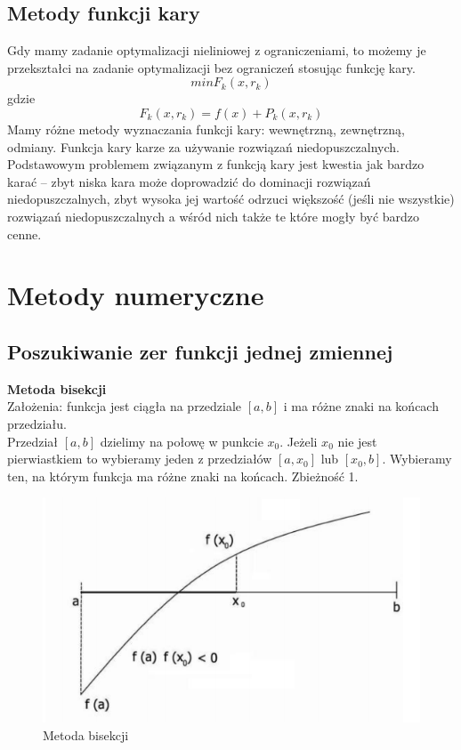 \documentclass[12pt]{article}
\begin{document}
\subsection{Metody funkcji kary}
Gdy mamy zadanie optymalizacji nieliniowej z ograniczeniami, to możemy je przekształci na zadanie optymalizacji bez ograniczeń stosując funkcję kary.
$$min F_{k}(x,r_{k})$$ gdzie $$F_{k}(x,r_{k}) = f(x) + P_{k}(x,r_{k})$$ Mamy różne metody wyznaczania funkcji kary: wewnętrzną, zewnętrzną, odmiany. Funkcja kary karze za używanie rozwiązań niedopuszczalnych. Podstawowym problemem związanym z funkcją kary jest kwestia jak bardzo karać – zbyt niska kara może doprowadzić do dominacji rozwiązań niedopuszczalnych, zbyt wysoka jej wartość odrzuci większość (jeśli nie wszystkie) rozwiązań niedopuszczalnych a wśród nich także te które mogły być bardzo cenne.

\section{Metody numeryczne}

\subsection{Poszukiwanie zer funkcji jednej zmiennej}

\textbf{Metoda bisekcji}\\
Założenia: funkcja jest ciągła na przedziale $[a,b]$ i ma różne znaki na końcach przedziału.\\
Przedział $[a,b]$ dzielimy na połowę w punkcie $x_{0}$. Jeżeli $x_{0}$ nie jest pierwiastkiem to wybieramy jeden z przedziałów $[a,x_{0}]$ lub $[x_{0},b]$. Wybieramy ten, na którym funkcja ma różne znaki na końcach. Zbieżność 1.\\
\begin{figure}[H]
	\centering
	\includegraphics[scale=0.7]{Pictures/metoda_bisekcji}
	\caption{Metoda bisekcji}
\end{figure}
\end{document}
